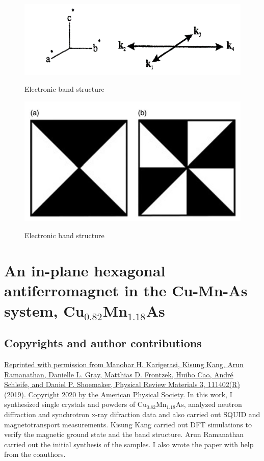 \documentclass[10pt,doublespacing,edeposit]{uiucthesis2020}
\newcommand*{\cumnas}{Cu$_{0.82}$Mn$_{1.18}$As}
\begin{document}
\begin{mainmatter}
\begin{figure}
\centering\includegraphics[width=0.7\columnwidth]{figures/ch4/star_of_propagation_vector_k.png} \\
\caption{\label{fig:star}
Electronic band structure
}
\end{figure}

\begin{figure}
\centering\includegraphics[width=0.5\columnwidth]{figures/ch4/symmetry_based_analysis.png} \\
\caption{\label{fig:symmetry_based_analysis}
Electronic band structure
}
\end{figure}

\Blindtext[6]


\chapter{An in-plane hexagonal antiferromagnet in the Cu-Mn-As system, Cu$_{0.82}$Mn$_{1.18}$As}

\section{Copyrights and author contributions}
\href{https://doi.org/10.1103/PhysRevMaterials.3.111402}{Reprinted with permission from Manohar H. Karigerasi, Kisung Kang, Arun Ramanathan, Danielle L. Gray, Matthias D. Frontzek, Huibo Cao, Andr\'e Schleife, and Daniel P. Shoemaker, Physical Review Materials 3, 111402(R) (2019). Copyright 2020 by the American Physical Society.} In this work, I synthesized single crystals and powders of \cumnas, analyzed neutron diffraction and synchrotron x-ray difraction data and also carried out SQUID and magnetotransport measurements. Kisung Kang carried out DFT simulations to verify the magnetic ground state and the band structure. Arun Ramanathan carried out the initial synthesis of the samples. I also wrote the paper with help from the coauthors.


\end{mainmatter}
\end{document}
